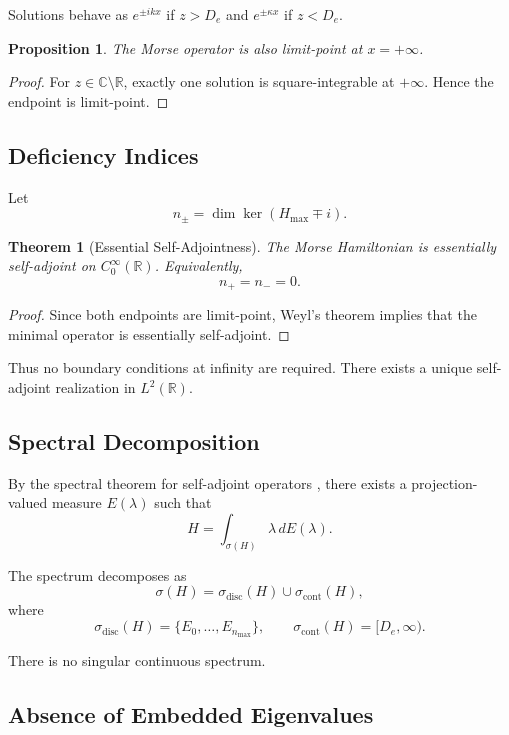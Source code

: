 \documentclass[11pt]{article}
\newtheorem{theorem}{Theorem}
\newtheorem{proposition}{Proposition}
\begin{document}
Solutions behave as $e^{\pm ikx}$ if $z>D_e$
and $e^{\pm \kappa x}$ if $z<D_e$.

\begin{proposition}
The Morse operator is also limit-point at $x=+\infty$.
\end{proposition}

\begin{proof}
For $z\in\mathbb C\setminus\mathbb R$, exactly one solution
is square-integrable at $+\infty$.
Hence the endpoint is limit-point.
\end{proof}

\subsection{Deficiency Indices}

Let
\[
n_\pm=\dim\ker(H_{\max}\mp i).
\]

\begin{theorem}[Essential Self-Adjointness]
The Morse Hamiltonian is essentially self-adjoint on
$C_0^\infty(\mathbb{R})$.
Equivalently,
\[
n_+=n_-=0.
\]
\end{theorem}

\begin{proof}
Since both endpoints are limit-point,
Weyl's theorem implies that the minimal operator is
essentially self-adjoint.
\end{proof}

Thus no boundary conditions at infinity are required.
There exists a unique self-adjoint realization in $L^2(\mathbb R)$.

\subsection{Spectral Decomposition}

By the spectral theorem for self-adjoint operators
\cite{reed-simon1}, there exists a projection-valued measure
$E(\lambda)$ such that
\[
H=\int_{\sigma(H)} \lambda\, dE(\lambda).
\]

The spectrum decomposes as
\[
\sigma(H)=\sigma_{\text{disc}}(H)
\cup
\sigma_{\text{cont}}(H),
\]
where
\[
\sigma_{\text{disc}}(H)
=\{E_0,\dots,E_{n_{\max}}\},
\qquad
\sigma_{\text{cont}}(H)=[D_e,\infty).
\]

There is no singular continuous spectrum.

\subsection{Absence of Embedded Eigenvalues}
\end{document}
